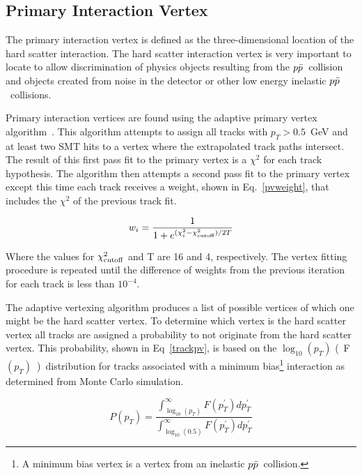 \subsection{Primary Interaction Vertex}
\label{pvreco}

The primary interaction vertex is defined as the three-dimensional location of the hard scatter interaction. The hard scatter interaction vertex is very important to locate to allow discrimination of physics objects resulting from the $\mbox{$p\bar{p}$}$~collision and objects created from noise in the detector or other low energy inelastic $\mbox{$p\bar{p}$}$~collisions.

Primary interaction vertices are found using the adaptive primary vertex algorithm~\cite{pv}. This algorithm attempts to assign all tracks with $p_{T}>0.5$~GeV and at least two SMT hits to a vertex where the extrapolated track paths intersect. The result of this first pass fit to the primary vertex is a $\chi^{2}$ for each track hypothesis. The algorithm then attempts a second pass fit to the primary vertex except this time each track receives a weight, shown in Eq.~\ref{pvweight}, that includes the $\chi^{2}$ of the previous track fit.

\begin{equation}
\label{pvweight}
w_{i} = \frac{1}{1+e^{(\chi^{2}_{i} - \chi^{2}_{\rm{cutoff}})/2T}}
\end{equation}

\noindent Where the values for $\chi^{2}_{\rm{cutoff}}$ and T are 16 and 4, respectively. The vertex fitting procedure is repeated until the difference of weights from the previous iteration for each track is less than $10^{-4}$.

The adaptive vertexing algorithm produces a list of possible vertices of which one might be the hard scatter vertex. To determine which vertex is the hard scatter vertex all tracks are assigned a probability to not originate from the hard scatter vertex. This probability, shown in Eq~\ref{trackpv}, is based on the $\log_{10}(p_{T})$ (~F$(p_{T})$~)~distribution for tracks associated with a minimum bias\footnote{A minimum bias vertex is a vertex from an inelastic $\mbox{$p\bar{p}$}$~collision.} interaction as determined from Monte Carlo simulation.

\begin{equation}
\label{trackpv}
P(p_{T}) = \frac{\int_{\log_{10}(p_{T})}^{\infty} F(p^{'}_{T})dp^{'}_{T}}{\int_{\log_{10}(0.5)}^{\infty} F(p^{'}_{T})dp^{'}_{T}}
\end{equation}

